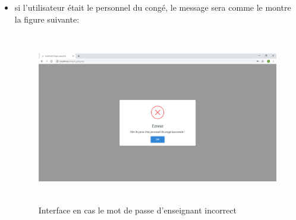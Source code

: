 \documentclass[12 pt ]{report}
\begin{document}
\begin{itemize}[label=]
\item si l'utilisateur était le personnel du congé, le message sera comme le montre la figure suivante:
\begin{figure}[h]
\begin{center}
\includegraphics[width=14cm,height=7.5cm]{login8.png}
\caption{Interface en cas le mot de passe d'enseignant incorrect}
\end{center}
\end{figure}
\end{itemize}
\newpage
\end{document}
